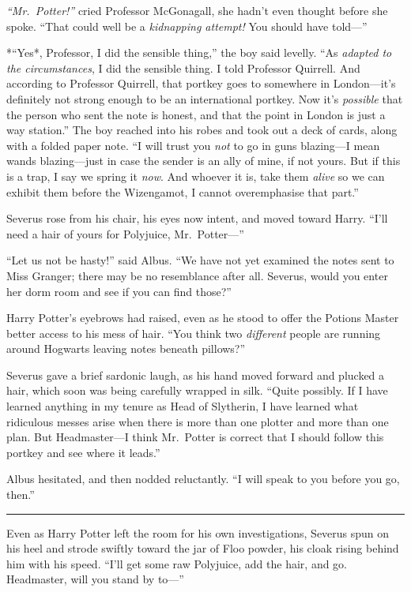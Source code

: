 \emph{``Mr.~Potter!''} cried Professor McGonagall, she hadn't even
thought before she spoke. ``That could well be a \emph{kidnapping
attempt!} You should have told---''

*``Yes*, Professor, I did the sensible thing,'' the boy said levelly.
``As \emph{adapted to the circumstances}, I did the sensible thing. I
told Professor Quirrell. And according to Professor Quirrell, that
portkey goes to somewhere in London---it's definitely not strong enough
to be an international portkey. Now it's \emph{possible} that the person
who sent the note is honest, and that the point in London is just a way
station.'' The boy reached into his robes and took out a deck of cards,
along with a folded paper note. ``I will trust you \emph{not} to go in
guns blazing---I mean wands blazing---just in case the sender is an ally
of mine, if not yours. But if this is a trap, I say we spring it
\emph{now}. And whoever it is, take them \emph{alive} so we can exhibit
them before the Wizengamot, I cannot overemphasise that part.''

Severus rose from his chair, his eyes now intent, and moved toward
Harry. ``I'll need a hair of yours for Polyjuice, Mr.~Potter---''

``Let us not be hasty!'' said Albus. ``We have not yet examined the
notes sent to Miss Granger; there may be no resemblance after all.
Severus, would you enter her dorm room and see if you can find those?''

Harry Potter's eyebrows had raised, even as he stood to offer the
Potions Master better access to his mess of hair. ``You think two
\emph{different} people are running around Hogwarts leaving notes
beneath pillows?''

Severus gave a brief sardonic laugh, as his hand moved forward and
plucked a hair, which soon was being carefully wrapped in silk. ``Quite
possibly. If I have learned anything in my tenure as Head of Slytherin,
I have learned what ridiculous messes arise when there is more than one
plotter and more than one plan. But Headmaster---I think Mr.~Potter is
correct that I should follow this portkey and see where it leads.''

Albus hesitated, and then nodded reluctantly. ``I will speak to you
before you go, then.''

\begin{center}\rule{3in}{0.4pt}\end{center}

Even as Harry Potter left the room for his own investigations, Severus
spun on his heel and strode swiftly toward the jar of Floo powder, his
cloak rising behind him with his speed. ``I'll get some raw Polyjuice,
add the hair, and go. Headmaster, will you stand by to---''

